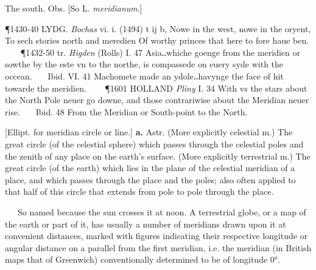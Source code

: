 \begin{description}[wide, labelwidth=!, labelindent=0pt]
\begin{myenumerate}
 The south. Obs. [So L. \textit{meridianum}.]

\P 1430-40 LYDG.  \textit{Bochas} vi. i. (1494) t ij b, Nowe in the west, nowe in the oryent, To sech stories north and meredien Of worthy princes that here to fore haue ben.    
\P 1432-50 tr.  \textit{Higden} (Rolls) I. 47 Asia‥whiche goenge from the meridien or sowthe by the este vn to the northe, is compassede on euery syde with the occean.    Ibid. VI. 41 Machomete made an ydole‥havynge the face of hit towarde the meridien.    
\P 1601 HOLLAND  \textit{Pliny} I. 34 With vs the stars about the North Pole neuer go downe, and those contrariwise about the Meridian neuer rise.    Ibid. 48 From the Meridian or South-point to the North.

 [Ellipt. for meridian circle or line.] \textbf{a.} Astr. (More explicitly celestial m.) The great circle (of the celestial sphere) which passes through the celestial poles and the zenith of any place on the earth's surface.  (More explicitly terrestrial m.) The great circle (of the earth) which lies in the plane of the celestial meridian of a place, and which passes through the place and the poles; also often applied to that half of this circle that extends from pole to pole through the place.

   So named because the sun crosses it at noon. A terrestrial globe, or a map of the earth or part of it, has usually a number of meridians drawn upon it at convenient distances, marked with figures indicating their respective longitude or angular distance on a parallel from the first meridian, i.e. the meridian (in British maps that of Greenwich) conventionally determined to be of longitude 0°.


\end{myenumerate}
\end{description}
